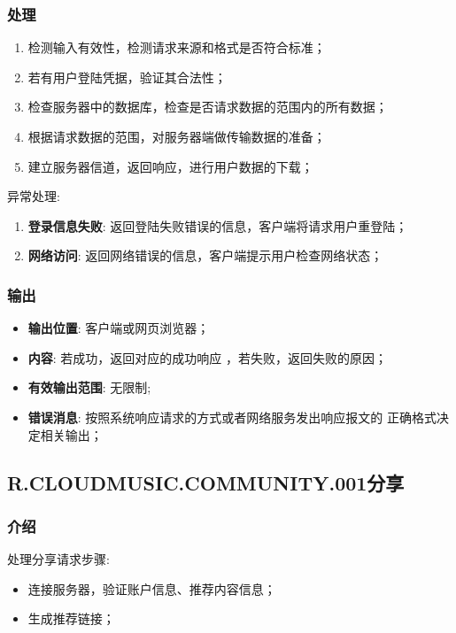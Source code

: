 \subsubsection{处理}
	\begin{enumerate}
		\item 检测输入有效性，检测请求来源和格式是否符合标准；
		\item 若有用户登陆凭据，验证其合法性；
		\item 检查服务器中的数据库，检查是否请求数据的范围内的所有数据；
		\item 根据请求数据的范围，对服务器端做传输数据的准备；
		\item 建立服务器信道，返回响应，进行用户数据的下载；
	\end{enumerate}
	\noindent 异常处理: 
	\begin{enumerate}
		\item \textbf{登录信息失败}: 返回登陆失败错误的信息，客户端将请求用户重登陆；
		\item \textbf{网络访问}: 返回网络错误的信息，客户端提示用户检查网络状态；
	\end{enumerate}
\subsubsection{输出}
\begin{itemize}
	\item \textbf{输出位置}: 客户端或网页浏览器；
	\item \textbf{内容}: 若成功，返回对应的成功响应 ，若失败，返回失败的原因；
	\item \textbf{有效输出范围}: 无限制;
	\item \textbf{错误消息}: 按照系统响应请求的方式或者网络服务发出响应报文的
		正确格式决定相关输出；
\end{itemize}


\subsection{R.CLOUDMUSIC.COMMUNITY.001分享}
\subsubsection{介绍}
	处理分享请求步骤:
	\begin{itemize}
		\item 连接服务器，验证账户信息、推荐内容信息；
		\item 生成推荐链接；
	\end{itemize}
